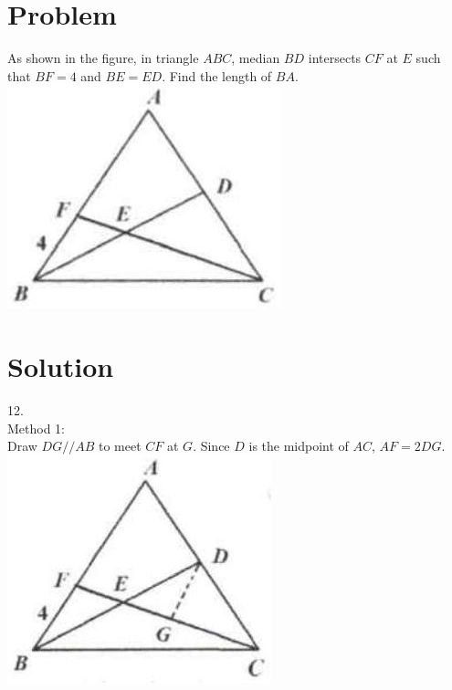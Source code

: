 \documentclass{article}
\begin{document}
\section*{Problem}
As shown in the figure, in triangle \(A B C\), median \(B D\) intersects \(C F\) at \(E\) such that \(B F=4\) and \(B E=E D\). Find the length of \(B A\).\\
\centering
\includegraphics[width=\textwidth]{images/126(2).jpg}

\section*{Solution}
12.\\
Method 1:\\
Draw \(D G / / A B\) to meet \(C F\) at \(G\). Since \(D\) is the midpoint of \(A C\), \(A F=2 D G\).\\
\centering
\includegraphics[width=\textwidth]{images/131(1).jpg}
\end{document}
